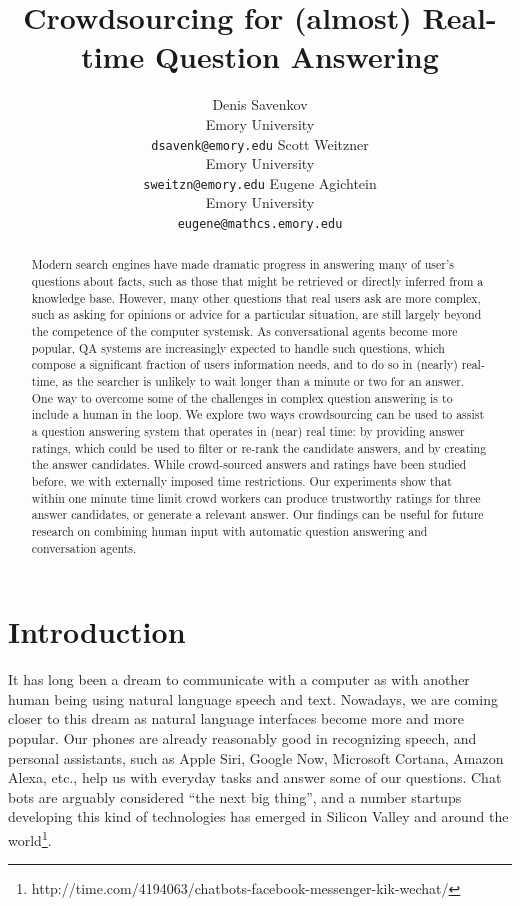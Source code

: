 \documentclass[11pt,letterpaper]{article}
\title{Crowdsourcing for (almost) Real-time Question Answering}
\author{Denis Savenkov \\ Emory University \\ {\tt dsavenk@emory.edu} 
  \And Scott Weitzner \\ Emory University \\ {\tt sweitzn@emory.edu}
  \And Eugene Agichtein \\ Emory University \\ {\tt eugene@mathcs.emory.edu}
}
\date{}
\begin{document}
\maketitle

\begin{abstract}

Modern search engines have made dramatic progress in answering many of user's questions about facts, such as those that might be retrieved or directly inferred from a knowledge base. However, many other questions that real users ask are more complex, such as asking for opinions or advice for a particular situation, are still largely beyond the competence of the computer systemsk.
As conversational agents become more popular, QA systems are increasingly expected to handle such questions, which compose a significant fraction of users information needs, and to do so in (nearly) real-time, as the searcher is unlikely to wait longer than a minute or two for an answer.
One way to overcome some of the challenges in complex question answering is to include a human in the loop.
We explore two ways crowdsourcing can be used to assist a question answering system that operates in (near) real time: by providing answer ratings, which could be used to filter or re-rank the candidate answers, and by creating the answer candidates. While crowd-sourced answers and ratings have been studied before, we  with externally imposed time restrictions. 
Our experiments show that within one minute time limit crowd workers can produce trustworthy ratings for three answer candidates, or generate a relevant answer.
Our findings can be useful for future research on combining human input with automatic question answering and conversation agents.

\end{abstract}

\section{Introduction}
\label{sec:introduction}

It has long been a dream to communicate with a computer as with another human being using natural language speech and text.
Nowadays, we are coming closer to this dream as natural language interfaces become more and more popular.
Our phones are already reasonably good in recognizing speech, and personal assistants, such as Apple Siri, Google Now, Microsoft Cortana, Amazon Alexa, etc., help us with everyday tasks and answer some of our questions.
Chat bots are arguably considered ``the next big thing'', and a number startups developing this kind of technologies has emerged in Silicon Valley and around the world\footnote{http://time.com/4194063/chatbots-facebook-messenger-kik-wechat/}.
\end{document}
